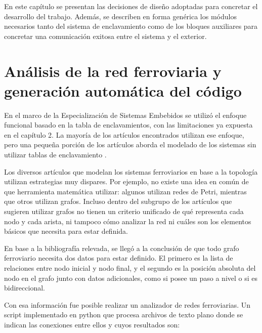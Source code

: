 En este capítulo se presentan las decisiones de diseño adoptadas para concretar el desarrollo del trabajo. Además, se describen en forma genérica los módulos necesarios tanto del sistema de enclavamiento como de los bloques auxiliares para concretar una comunicación exitosa entre el sistema y el exterior.

\section{Análisis de la red ferroviaria y generación automática del código}

	En el marco de la Especialización de Sistemas Embebidos se utilizó el enfoque funcional basado en la tabla de enclavamientos, con las limitaciones ya expuesta en el capítulo 2. La mayoría de los artículos encontrados utilizan ese enfoque\citep{FUNCIONAL}, pero una pequeña porción de los artículos aborda el modelado de los sistemas sin utilizar tablas de enclavamiento \citep{GEOGRAFICO}.
	
	Los diversos artículos que modelan los sistemas ferroviarios en base a la topología utilizan estrategias muy dispares. Por ejemplo, no existe una idea en común de que herramienta matemática utilizar: algunos utilizan redes de Petri, mientras que otros utilizan grafos. Incluso dentro del subgrupo de los artículos que sugieren utilizar grafos no tienen un criterio unificado de qué representa cada nodo y cada arista, ni tampoco cómo analizar la red ni cuáles son los elementos básicos que necesita para estar definida.	
	
	En base a la bibliografía relevada, se llegó a la conclusión de que todo grafo ferroviario necesita dos datos para estar definido. El primero es la lista de relaciones entre nodo inicial y nodo final, y el segundo es la posición absoluta del nodo en el grafo junto con datos adicionales, como si posee un paso a nivel o si es bidireccional. 
	
	Con esa información fue posible realizar un analizador de redes ferroviarias. Un script implementado en python que procesa archivos de texto plano donde se indican las conexiones entre ellos y cuyos resultados son:
	
